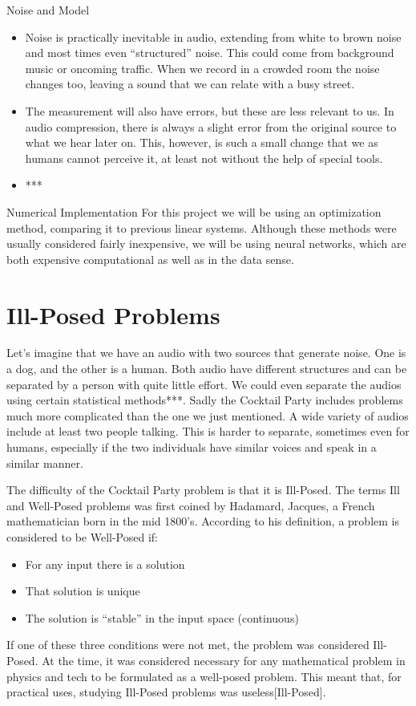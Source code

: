 \documentclass{book}
\begin{document}
\begin{center}
    \noindent Noise and Model
\end{center}
\begin{itemize}
    \item Noise is practically inevitable in audio, extending from white to brown noise and most times even “structured” noise. This could come from background music or oncoming traffic. When we record in a crowded room the noise changes too, leaving a sound that we can relate with a busy street.

    \item The measurement will also have errors, but these are less relevant to us. In audio compression, there is always a slight error from the original source to what we hear later on. This, however, is such a small change that we as humans cannot perceive it, at least not without the help of special tools.

    \item ***
\end{itemize}
    
Numerical Implementation
    For this project we will be using an optimization method, comparing it to previous linear systems. Although these methods were usually considered fairly inexpensive, we will be using neural networks, which are both expensive computational as well as in the data sense. 


\section{Ill-Posed Problems}

\qquad Let's imagine that we have an audio with two sources that generate noise. One is a dog, and the other is a human. Both audio have different structures and can be separated by a person with quite little effort. We could even separate the audios using certain statistical methods***. Sadly the Cocktail Party includes problems much more complicated than the one we just mentioned. A wide variety of audios include at least two people talking. This is harder to separate, sometimes even for humans, especially if the two individuals have similar voices and speak in a similar manner.
\par
    The difficulty of the Cocktail Party problem is that it is Ill-Posed. The terms Ill and Well-Posed problems was first coined by Hadamard, Jacques, a French mathematician born in the mid 1800’s. According to his definition, a problem is considered to be Well-Posed if: 
\begin{itemize}
    \item For any input there is a solution
    \item That solution is unique
    \item The solution is “stable” in the input space (continuous)
\end{itemize}
    If one of these three conditions were not met, the problem was considered Ill-Posed. At the time, it was considered necessary for any mathematical problem in physics and tech to be formulated as a well-posed problem. This meant that, for practical uses, studying Ill-Posed problems was useless[Ill-Posed].
\end{document}

